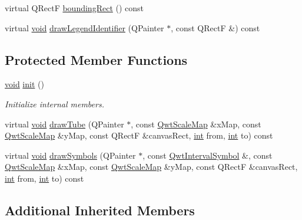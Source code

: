 \begin{DoxyCompactItemize}
\item 
virtual Q\-Rect\-F \hyperlink{class_qwt_plot_interval_curve_ae4b1140a52682976bb5946a772b7da7c}{bounding\-Rect} () const 
\item 
virtual \hyperlink{group___u_a_v_objects_plugin_ga444cf2ff3f0ecbe028adce838d373f5c}{void} \hyperlink{class_qwt_plot_interval_curve_a3cd73ea413b99647d8e3e9d8dc322431}{draw\-Legend\-Identifier} (Q\-Painter $\ast$, const Q\-Rect\-F \&) const 
\end{DoxyCompactItemize}
\subsection*{Protected Member Functions}
\begin{DoxyCompactItemize}
\item 
\hyperlink{group___u_a_v_objects_plugin_ga444cf2ff3f0ecbe028adce838d373f5c}{void} \hyperlink{class_qwt_plot_interval_curve_a98d9de9cc61e59e24d72e4f459b4b321}{init} ()
\begin{DoxyCompactList}\small\item\em Initialize internal members. \end{DoxyCompactList}\item 
virtual \hyperlink{group___u_a_v_objects_plugin_ga444cf2ff3f0ecbe028adce838d373f5c}{void} \hyperlink{class_qwt_plot_interval_curve_ae5522b27d49da7a99f8b01b577fa153e}{draw\-Tube} (Q\-Painter $\ast$, const \hyperlink{class_qwt_scale_map}{Qwt\-Scale\-Map} \&x\-Map, const \hyperlink{class_qwt_scale_map}{Qwt\-Scale\-Map} \&y\-Map, const Q\-Rect\-F \&canvas\-Rect, \hyperlink{ioapi_8h_a787fa3cf048117ba7123753c1e74fcd6}{int} from, \hyperlink{ioapi_8h_a787fa3cf048117ba7123753c1e74fcd6}{int} to) const 
\item 
virtual \hyperlink{group___u_a_v_objects_plugin_ga444cf2ff3f0ecbe028adce838d373f5c}{void} \hyperlink{class_qwt_plot_interval_curve_a54682faaed2110816fe874cad37142b7}{draw\-Symbols} (Q\-Painter $\ast$, const \hyperlink{class_qwt_interval_symbol}{Qwt\-Interval\-Symbol} \&, const \hyperlink{class_qwt_scale_map}{Qwt\-Scale\-Map} \&x\-Map, const \hyperlink{class_qwt_scale_map}{Qwt\-Scale\-Map} \&y\-Map, const Q\-Rect\-F \&canvas\-Rect, \hyperlink{ioapi_8h_a787fa3cf048117ba7123753c1e74fcd6}{int} from, \hyperlink{ioapi_8h_a787fa3cf048117ba7123753c1e74fcd6}{int} to) const 
\end{DoxyCompactItemize}
\subsection*{Additional Inherited Members}


